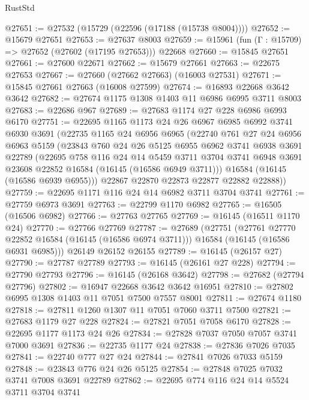 \begin{lexlean}{RustStd}
\begin{coremodule}
@27651 := @27532 (@15729 (@22596 (@17188 (@15738 @8004))))
@27652 := @15679 @27651
@27653 := @27637 @8003
@27659 := @15961 (fun (Γ : @15709) => @27652 (@27602 (@17195 @27653))) @22668
@27660 := @15845 @27651
@27661 := @27600 @22671
@27662 := @15679 @27661
@27663 := @22675 @27653
@27667 := @27660 (@27662 @27663) (@16003 @27531)
@27671 := @15845 @27661 @27663 (@16008 @27599)
@27674 := @16893 @22668 @3642 @3642
@27682 := @27674 @1175 @1308 @1403 @11 @6986 @6995 @3711 @8003
@27683 := @22686 @967
@27689 := @27683 @1174 @27 @228 @6986 @6993 @6170
@27751 := @22695
    @1165
    @1173
    @24
    @26
    @6967
    @6985
    @6992
    @3741
    @6930
    @3691
    (@22735
      @1165
      @24
      @6956
      @6965
      (@22740
        @761
        @27
        @24
        @6956
        @6963
        @5159
        (@23843
          @760
          @24
          @26
          @5125
          @6955
          @6962
          @3741
          @6938
          @3691
          @22789
          (@22695
            @758
            @116
            @24
            @14
            @5459
            @3711
            @3704
            @3741
            @6948
            @3691
            @23608
            @22852
            @16584
            (@16145 (@16586 @6949 @3711)))
          @16584
          (@16145 (@16586 @6939 @6955)))
        @22867
        @22870
        @22873
        @22877
        @22882
        @22888))
@27759 := @22695 @1171 @116 @24 @14 @6982 @3711 @3704 @3741
@27761 := @27759 @6973 @3691
@27763 := @22799 @1170 @6982
@27765 := @16505 (@16506 @6982)
@27766 := @27763 @27765
@27769 := @16145 (@16511 @1170 @24)
@27770 := @27766 @27769
@27787 := @27689
    (@27751
      (@27761 @27770 @22852 @16584 (@16145 (@16586 @6974 @3711)))
      @16584
      (@16145 (@16586 @6931 @6985)))
    @26149
    @26152
    @26155
@27789 := @16145 (@26157 @27)
@27790 := @27787 @27789
@27793 := @16145 (@26161 @27 @228)
@27794 := @27790 @27793
@27796 := @16145 (@26168 @3642)
@27798 := @27682 (@27794 @27796)
@27802 := @16947 @22668 @3642 @3642 @16951
@27810 := @27802 @6995 @1308 @1403 @11 @7051 @7500 @7557 @8001
@27811 := @27674 @1180
@27818 := @27811 @1260 @1307 @11 @7051 @7060 @3711 @7500
@27821 := @27683 @1179 @27 @228
@27824 := @27821 @7051 @7058 @6170
@27828 := @22695 @1177 @1173 @24 @26
@27834 := @27828 @7037 @7050 @7057 @3741 @7000 @3691
@27836 := @22735 @1177 @24
@27838 := @27836 @7026 @7035
@27841 := @22740 @777 @27 @24
@27844 := @27841 @7026 @7033 @5159
@27848 := @23843 @776 @24 @26 @5125
@27854 := @27848 @7025 @7032 @3741 @7008 @3691 @22789
@27862 := @22695 @774 @116 @24 @14 @5524 @3711 @3704 @3741

\end{coremodule}
\end{lexlean}
